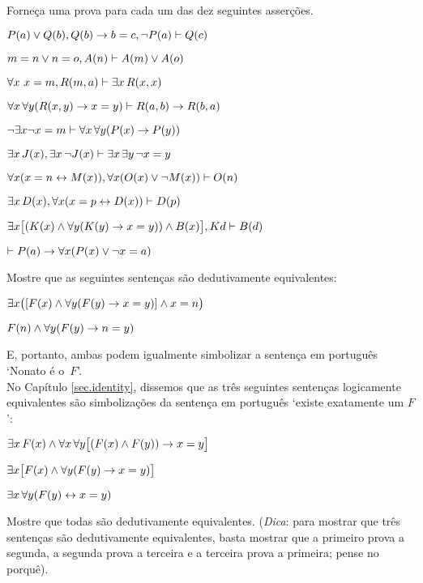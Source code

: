 \practiceproblems
\problempart
\label{pr.identity}
Forneça uma prova para cada um das dez seguintes asserções.
   
\begin{earg}
\item $\mathord{P}(a) \vee \mathord{Q}(b), \mathord{Q}(b) \rightarrow b=c, \neg\mathord{P}(a) \vdash \mathord{Q}(c)$
\item $m=n \vee n=o, \mathord{A}(n) \vdash \mathord{A}(m) \vee \mathord{A}(o)$
\item $\forall x\ x=m, \mathord{R}(m,a) \vdash \exists x\,\mathord{R}(x,x)$
\item $\forall x\,\forall y(\mathord{R}(x,y) \rightarrow x=y)\vdash \mathord{R}(a,b) \rightarrow \mathord{R}(b,a)$
\item $\neg \exists x\neg x = m \vdash \forall x\,\forall y (\mathord{P}(x) \rightarrow \mathord{P}(y))$
\item $\exists x\,\mathord{J}(x), \exists x\, \neg\mathord{J}(x)\vdash \exists x\, \exists y\, \neg x = y$
\item $\forall x(x=n \leftrightarrow \mathord{M}(x)), \forall x(\mathord{O}(x) \vee \neg \mathord{M}(x))\vdash \mathord{O}(n)$
\item $\exists x\,\mathord{D}(x), \forall x(x=p \leftrightarrow \mathord{D}(x))\vdash \mathord{D}(p)$
\item $\exists x\bigl[(\mathord{K}(x) \wedge \forall y(\mathord{K}(y) \rightarrow x=y)) \wedge \mathord{B}(x)\bigr], Kd\vdash \mathord{B}(d)$
\item $\vdash \mathord{P}(a) \rightarrow \forall x(\mathord{P}(x) \vee \neg x = a)$
\end{earg}

\problempart
Mostre que as seguintes sentenças são dedutivamente equivalentes:
\begin{ebullet}
\item $\exists x \bigl([\mathord{F}(x) \wedge \forall y (\mathord{F}(y) \rightarrow x = y)] \wedge x = n\bigr)$
\item $\mathord{F}(n) \wedge \forall y (\mathord{F}(y) \rightarrow n= y)$
\end{ebullet}
E, portanto, ambas podem igualmente simbolizar a sentença em português `Nonato é o~$F$'.\\

\problempart
No Capítulo   \ref{sec.identity}, dissemos que as três seguintes sentenças logicamente equivalentes  são simbolizações da sentença em português `existe exatamente um $F$':
\begin{ebullet}
\item $\exists x\,\mathord{F}(x) \wedge \forall x\, \forall y \bigl[(\mathord{F}(x) \wedge \mathord{F}(y)) \rightarrow x = y\bigr]$
\item $\exists x \bigl[\mathord{F}(x) \wedge \forall y (\mathord{F}(y) \rightarrow x = y)\bigr]$
\item $\exists x\, \forall y (\mathord{F}(y) \leftrightarrow x = y)$
\end{ebullet}
Mostre que todas são dedutivamente equivalentes. (\emph{Dica}: para mostrar que três sentenças são dedutivamente equivalentes, basta mostrar que a  primeiro  prova a segunda, a segunda prova a terceira e a terceira prova a primeira; pense no porquê).

